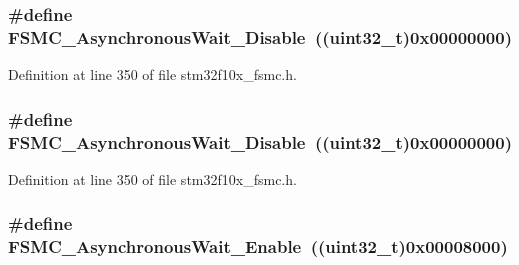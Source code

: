 \subsubsection[{\texorpdfstring{F\+S\+M\+C\+\_\+\+Asynchronous\+Wait\+\_\+\+Disable}{FSMC_AsynchronousWait_Disable}}]{\setlength{\rightskip}{0pt plus 5cm}\#define F\+S\+M\+C\+\_\+\+Asynchronous\+Wait\+\_\+\+Disable~(({\bf uint32\+\_\+t})0x00000000)}\hypertarget{group___f_s_m_c___asynchronous_wait_ga36c0dad6fe6c0e01632d3312c8f4c4cb}{}\label{group___f_s_m_c___asynchronous_wait_ga36c0dad6fe6c0e01632d3312c8f4c4cb}


Definition at line 350 of file stm32f10x\+\_\+fsmc.\+h.

\subsubsection[{\texorpdfstring{F\+S\+M\+C\+\_\+\+Asynchronous\+Wait\+\_\+\+Disable}{FSMC_AsynchronousWait_Disable}}]{\setlength{\rightskip}{0pt plus 5cm}\#define F\+S\+M\+C\+\_\+\+Asynchronous\+Wait\+\_\+\+Disable~(({\bf uint32\+\_\+t})0x00000000)}\hypertarget{group___f_s_m_c___asynchronous_wait_ga36c0dad6fe6c0e01632d3312c8f4c4cb}{}\label{group___f_s_m_c___asynchronous_wait_ga36c0dad6fe6c0e01632d3312c8f4c4cb}


Definition at line 350 of file stm32f10x\+\_\+fsmc.\+h.

\subsubsection[{\texorpdfstring{F\+S\+M\+C\+\_\+\+Asynchronous\+Wait\+\_\+\+Enable}{FSMC_AsynchronousWait_Enable}}]{\setlength{\rightskip}{0pt plus 5cm}\#define F\+S\+M\+C\+\_\+\+Asynchronous\+Wait\+\_\+\+Enable~(({\bf uint32\+\_\+t})0x00008000)}\hypertarget{group___f_s_m_c___asynchronous_wait_gaff524bfa697106ede7d4b557a5ad7d8c}{}\label{group___f_s_m_c___asynchronous_wait_gaff524bfa697106ede7d4b557a5ad7d8c}


